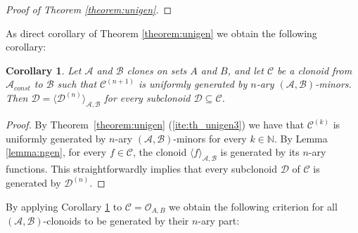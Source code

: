 \documentclass[11pt]{amsart}
\theoremstyle{plain}
\newtheorem{corollary}[thm]{Corollary}
\theoremstyle{definition}
\newcommand{\N}{{\mathbb N}}
\DeclareMathOperator{\id}{id}
\newcommand{\clone}[1]{\mathcal{#1}}
\newcommand{\clonoid}[1]{\mathcal{#1}}
\newcommand{\clodC}{\clonoid{C}}
\newcommand{\clodD}{\clonoid{D}}
\newcommand{\clodO}{\clonoid{O}}
\newcommand{\cloA}{\clone{A}}
\newcommand{\cloB}{\clone{B}}
\begin{document}
\begin{proof}[Proof of Theorem \ref{theorem:unigen}]

\end{proof}

As direct corollary of Theorem \ref{theorem:unigen} we obtain the following corollary:

\begin{corollary} \label{corollary:unigen1}
Let $\cloA$ and $\cloB$ clones on sets $A$ and $B$, and let $\clodC$ be a clonoid from $\cloA_{const}$ to $\cloB$ such that $\clodC^{(n+1)}$ is uniformly generated by $n$-ary $(\cloA, \cloB)$-minors. Then $\clodD = \langle \clodD^{(n)} \rangle_{\cloA, \cloB}$ for every subclonoid $\clodD \subseteq \clodC$. 
\end{corollary}

\begin{proof}
By Theorem~\ref{theorem:unigen} (\ref{ite:th_unigen3}) we have that $\mathcal C^{(k)}$ is uniformly generated by $n$-ary $(\cloA, \cloB)$-minors for every $k \in \N$. By Lemma \ref{lemma:ngen}, for every $f \in \clodC$, the clonoid $\langle f \rangle_{\cloA, \cloB}$ is generated by its $n$-ary functions. This straightforwardly implies that every subclonoid $\clodD$ of $\clodC$ is generated by $\clodD^{(n)}$.
\end{proof} 

By applying Corollary \ref{corollary:unigen1} to $\clodC = \clodO_{A,B}$ we obtain the following criterion for all $(\cloA, \cloB)$-clonoids to be generated by their $n$-ary part:
\end{document}
